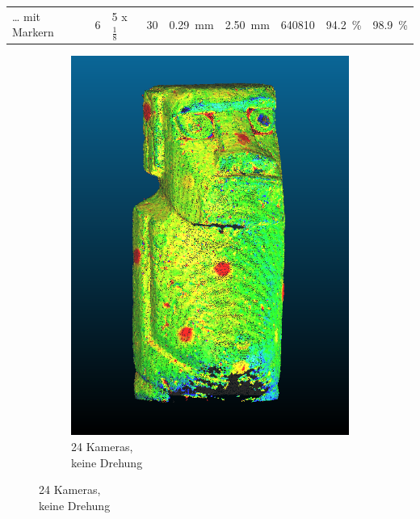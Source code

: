 \documentclass[./00PhotoBox.tex]{subfiles}
\begin{document}
\begin{table}[htbp]
{\begin{tabular}{l|l|l|l|l|l|l|l|l}
            … mit Markern  & 6                                                                 & 5 x $\frac{1}{8}$        & 30                       & \SI{0,29}{\milli\metre}                                             & \SI{2,50}{\milli\metre}                                             & 640810               & \SI{94,2}{\percent}                                                          & \SI{98,9}{\percent}
        \end{tabular}
    }
\end{table}


\begin{figure}[p]
    \centering
    \begin{subfigure}{0.30\textwidth}
        \includegraphics[width=1\linewidth]{img/7_versuche/cam_anzahl/normal.png}
        \centering
        \caption{
            24 Kameras,\\
            keine Drehung\\
}
\end{subfigure}
\end{figure}
\end{document}
